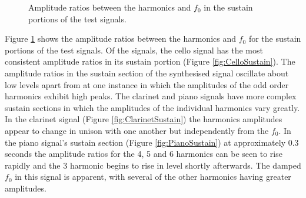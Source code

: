 \begin{figure}[h!]
			\quad
			\caption{Amplitude ratios between the harmonics and $f_{0}$ in the sustain
				 portions of the test signals.}
			\label{fig:SustainAmplitudes}
		\end{figure}

		Figure \ref{fig:SustainAmplitudes} shows the amplitude ratios between the harmonics and $f_{0}$ for the
		sustain portions of the test signals. Of the signals, the cello signal has the most consistent amplitude
		ratios in its sustain portion (Figure \ref{fig:CelloSustain}). The amplitude ratios in the sustain section
		of the synthesised signal oscillate about low levels apart from at one instance in which the amplitudes of
		the odd order harmonics exhibit high peaks. The clarinet and piano signals have more complex sustain
		sections in which the amplitudes of the individual harmonics vary greatly. In the clarinet signal (Figure
		\ref{fig:ClarinetSustain}) the harmonics amplitudes appear to change in unison with one another but
		independently from the $f_{0}$. In the piano signal's sustain section (Figure \ref{fig:PianoSustain}) at
		approximately 0.3 seconds the amplitude ratios for the 4, 5 and 6 harmonics
		can be seen to rise rapidly and the 3 harmonic begins to rise in level shortly afterwards. The
		damped $f_{0}$ in this signal is apparent, with several of the other harmonics having greater amplitudes.


